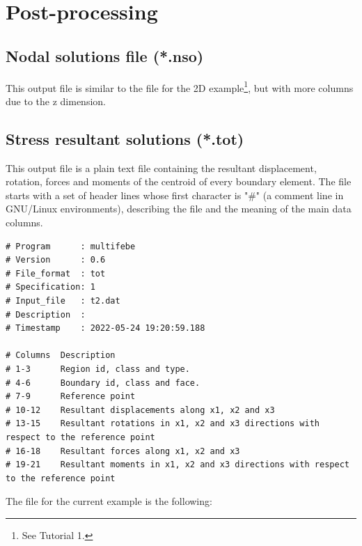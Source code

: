 \documentclass[a4]{article}
\begin{document}
\section{Post-processing}

\subsection{Nodal solutions file (*.nso)}

This output file is similar to the file for the 2D example\footnote{See Tutorial 1.}, but with more columns due to the z dimension. 

\subsection{Stress resultant solutions (*.tot)}

This output file is a plain text file containing the resultant  displacement, rotation, forces and moments of the centroid of every boundary element. The file starts with a set of header lines whose first character is "$\#$" (a comment line in GNU/Linux environments), describing the file and the meaning of the main data columns. 

\begin{Verbatim}
# Program      : multifebe
# Version      : 0.6
# File_format  : tot
# Specification: 1
# Input_file   : t2.dat
# Description  : 
# Timestamp    : 2022-05-24 19:20:59.188

# Columns  Description
# 1-3      Region id, class and type.
# 4-6      Boundary id, class and face.
# 7-9      Reference point
# 10-12    Resultant displacements along x1, x2 and x3
# 13-15    Resultant rotations in x1, x2 and x3 directions with respect to the reference point
# 16-18    Resultant forces along x1, x2 and x3
# 19-21    Resultant moments in x1, x2 and x3 directions with respect to the reference point
\end{Verbatim}

The file for the current example is the following:
\end{document}
